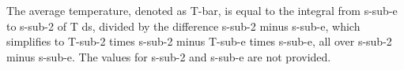 The average temperature, denoted as T-bar, is equal to the integral from s-sub-e to s-sub-2 of T ds, divided by the difference s-sub-2 minus s-sub-e, which simplifies to T-sub-2 times s-sub-2 minus T-sub-e times s-sub-e, all over s-sub-2 minus s-sub-e. The values for s-sub-2 and s-sub-e are not provided.